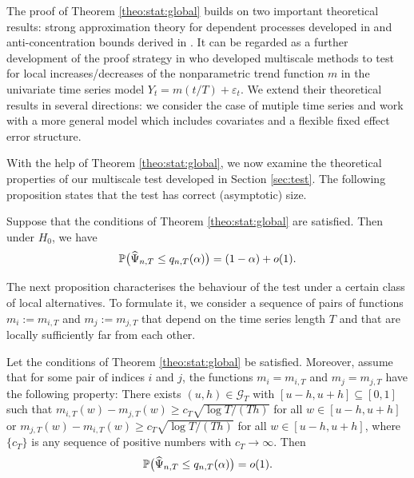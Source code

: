 \documentclass[a4paper,12pt]{article}
\begin{document}
\begin{remark}
The proof of Theorem \ref{theo:stat:global} builds on two important theoretical results: strong approximation theory for dependent processes developed in \cite{BerkesLiuWu2014} and anti-concentration bounds derived in \cite{Chernozhukov2015}. It can be regarded as a further development of the proof strategy in \cite{KhismatullinaVogt2020} who developed multiscale methods to test for local increases/decreases of the nonparametric trend function $m$ in the univariate time series model $Y_t = m(t/T) + \varepsilon_t$. We extend their theoretical results in several directions: we consider the case of mutiple time series and work with a more general model which includes covariates and a flexible fixed effect error structure.  
\end{remark}


With the help of Theorem \ref{theo:stat:global}, we now examine the theoretical properties of our multiscale test developed in Section \ref{sec:test}. The following proposition states that the test has correct (asymptotic) size.

\begin{prop}\label{prop:test}
Suppose that the conditions of Theorem \ref{theo:stat:global} are satisfied. Then under $H_0$, we have
\[ \mathbb{P} \big( \widehat{\Psi}_{n,T} \le q_{n,T}(\alpha) \big) = (1 - \alpha) + o(1). \]
\end{prop}

The next proposition characterises the behaviour of the test under a certain class of local alternatives. To formulate it, we consider a sequence of pairs of functions $m_ i := m_{i,T}$ and $m_ j := m_{j,T}$ that depend on the time series length $T$ and that are locally sufficiently far from each other.

\begin{prop}\label{prop:test:power}
Let the conditions  of Theorem \ref{theo:stat:global} be satisfied. Moreover, assume that for some pair of indices $i$ and $j$, the functions $m_ i = m_{i,T}$ and $m_ j = m_{j,T}$ have the following property: There exists $(u, h) \in \mathcal{G}_T$ with $[u-h, u+h] \subseteq [0,1]$ such that $m_{i,T}(w) - m_{j,T}(w) \ge c_T \sqrt{\log T/(Th)}$ for all $w \in [u-h, u+h]$ or $m_{j,T}(w) - m_{i,T}(w) \ge c_T \sqrt{\log T/(Th)}$ for all $w \in [u-h, u+h]$, where $\{c_T\}$ is any sequence of positive numbers with $c_T \rightarrow \infty$. Then 
\[ \mathbb{P} \big( \widehat{\Psi}_{n,T} \le q_{n,T}(\alpha) \big) = o(1). \]
\end{prop}
\end{document}
